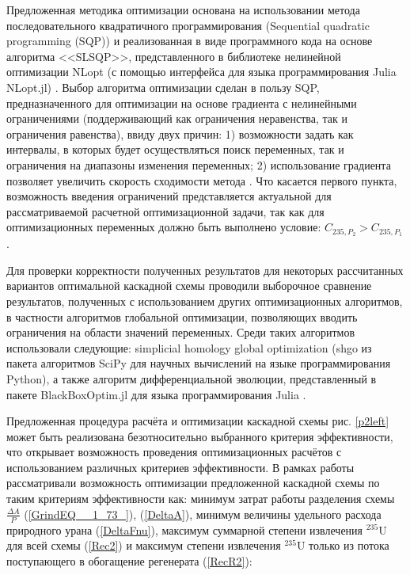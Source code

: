 Предложенная методика оптимизации основана на использовании метода последовательного квадратичного программирования (Sequential quadratic programming (SQP)) и реализованная в виде программного кода на основе алгоритма <<SLSQP>>, представленного в библиотеке нелинейной оптимизации NLopt (с помощью интерфейса для языка программирования Julia NLopt.jl) \cite{NLopt}. Выбор алгоритма оптимизации сделан в пользу SQP, предназначенного для оптимизации на основе градиента с нелинейными ограничениями (поддерживающий как ограничения неравенства, так и ограничения равенства), ввиду двух причин: 1) возможности задать как интервалы, в которых будет осуществляться поиск переменных, так и ограничения на диапазоны изменения переменных; 2) использование градиента позволяет увеличить скорость сходимости метода \cite{NumericalOptimization2006}. Что касается первого пункта, возможность введения ограничений представляется актуальной для рассматриваемой расчетной оптимизационной задачи, так как для оптимизационных переменных должно быть выполнено условие: ${C_{235,{P_2}}}>{C_{235,{P_1}}}$. 

Для проверки корректности полученных результатов для некоторых рассчитанных вариантов оптимальной каскадной схемы проводили выборочное сравнение результатов, полученных с использованием других оптимизационных алгоритмов, в частности алгоритмов глобальной оптимизации, позволяющих вводить ограничения на области значений переменных. Среди таких алгоритмов использовали следующие: simplicial homology global optimization (shgo из пакета алгоритмов SciPy для научных вычислений на языке программирования Python), а также алгоритм дифференциальной эволюции, представленный в пакете BlackBoxOptim.jl для языка программирования Julia \cite{пантелеевМетаэвристическиеАлгоритмыПоиска2009,virtanenSciPyFundamentalAlgorithms2020,endresSimplicialHomologyAlgorithm2018,mogensenOptimMathematicalOptimization2018,storn1997differential,Price-et-al-differential-evolution-2005,Feldt2018}.

Предложенная процедура расчёта и оптимизации каскадной схемы рис. \ref{p2left} может быть реализована безотносительно выбранного критерия эффективности, что открывает возможность проведения оптимизационных расчётов с использованием различных критериев эффективности. В рамках работы рассматривали возможность оптимизации предложенной каскадной схемы по таким критериям эффективности как: минимум затрат работы разделения схемы $\frac{\Delta A}{P}$ (\ref{GrindEQ__1_73_}), (\ref{DeltaA}), минимум величины удельного расхода природного урана (\ref{DeltaFnu}), максимум суммарной степени извлечения $^{235}$U для всей схемы (\ref{Rec2}) и максимум степени извлечения $^{235}$U  только из потока поступающего в обогащение регенерата (\ref{RecR2}):

